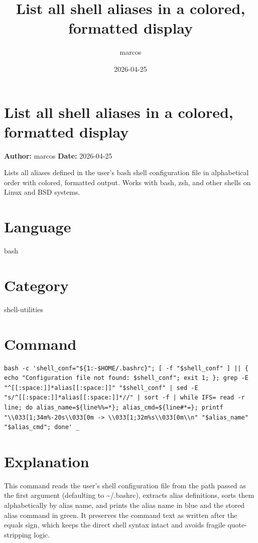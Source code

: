 \documentclass{article}
\title{List all shell aliases in a colored, formatted display}
\author{marcos}
\date{2026-04-25}
\begin{document}
\section*{List all shell aliases in a colored, formatted display}
\textbf{Author:} marcos \hfill \textbf{Date:} 2026-04-25

\noindent Lists all aliases defined in the user's bash shell configuration file in alphabetical order with colored, formatted output. Works with bash, zsh, and other shells on Linux and BSD systems.

\section*{Language}
bash

\section*{Category}
shell-utilities

\section*{Command}
\begin{lstlisting}
bash -c 'shell_conf="${1:-$HOME/.bashrc}"; [ -f "$shell_conf" ] || { echo "Configuration file not found: $shell_conf"; exit 1; }; grep -E "^[[:space:]]*alias[[:space:]]" "$shell_conf" | sed -E "s/^[[:space:]]*alias[[:space:]]*//" | sort -f | while IFS= read -r line; do alias_name=${line%%=*}; alias_cmd=${line#*=}; printf "\\033[1;34m%-20s\\033[0m -> \\033[1;32m%s\\033[0m\\n" "$alias_name" "$alias_cmd"; done' _
\end{lstlisting}

\section*{Explanation}
This command reads the user's shell configuration file from the path passed as the first argument (defaulting to \textasciitilde{}/.bashrc), extracts alias definitions, sorts them alphabetically by alias name, and prints the alias name in blue and the stored alias command in green. It preserves the command text as written after the equals sign, which keeps the direct shell syntax intact and avoids fragile quote-stripping logic.
\end{document}
